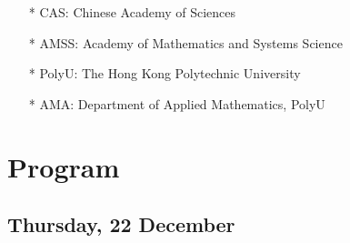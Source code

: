 \documentclass[
	openany, %
	parskip=full, %
	12pt, %
	a4paper, %
]{conferencebooklet} %
\begin{document}
\begin{center}
	\begin{itemize}
	    \item[*] CAS: Chinese Academy of Sciences
	    \item[*] AMSS: Academy of Mathematics and Systems Science
	    \item[*] PolyU: The Hong Kong Polytechnic University
	    \item[*] AMA: Department of Applied Mathematics, PolyU
	\end{itemize}
\end{center}



\chapter{Program}

\section{Thursday, 22 December}

\end{document}
